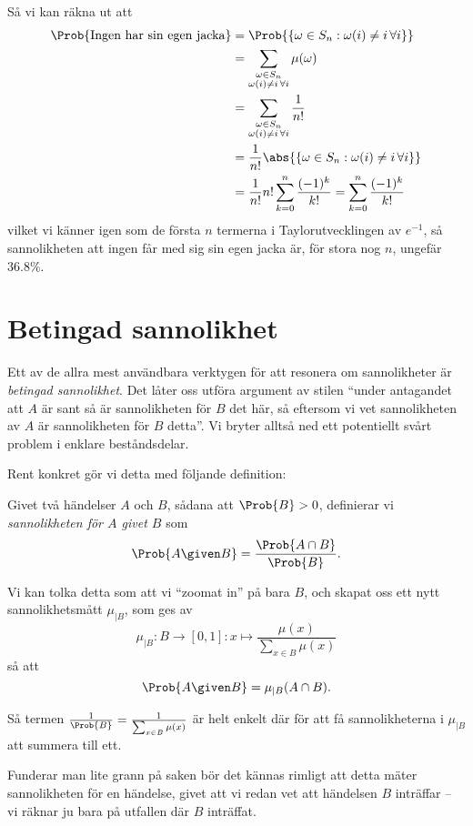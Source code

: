 \documentclass[nobib]{tufte-handout}
\begin{document}
\begin{example}
    Så vi kan räkna ut att
    \begin{align*}
        \Prob{\text{Ingen har sin egen jacka}} &= \Prob{\left\{\omega \in S_n: \omega(i) \neq i\, \forall i\right\}}\\
        &= \sum_{\substack{\omega \in S_n\\\omega(i) \neq i\, \forall i}} \mu(\omega)\\
        &= \sum_{\substack{\omega \in S_n\\\omega(i) \neq i\, \forall i}} \frac{1}{n!}\\
        &= \frac{1}{n!}\abs{\left\{\omega \in S_n: \omega(i) \neq i\, \forall i\right\}}\\
        &= \frac{1}{n!}n!\sum_{k=0}^{n} \frac{(-1)^k}{k!} = \sum_{k=0}^{n} \frac{(-1)^k}{k!}
    \end{align*}
    vilket vi känner igen som de första $n$ termerna i Taylorutvecklingen av $e^{-1}$, så sannolikheten att ingen får med sig sin egen jacka är, för stora nog $n$, ungefär $36.8\%$.
\end{example}

\section{Betingad sannolikhet}

Ett av de allra mest användbara verktygen för att resonera om sannolikheter är \emph{betingad sannolikhet}. Det låter oss utföra argument av stilen ``under antagandet att $A$ är sant så är sannolikheten för $B$ det här, så eftersom vi vet sannolikheten av $A$ är sannolikheten för $B$ detta''. Vi bryter alltså ned ett potentiellt svårt problem i enklare beståndsdelar.

Rent konkret gör vi detta med följande definition:

\begin{definition}
    Givet två händelser $A$ och $B$, sådana att $\Prob{B} > 0$, definierar vi \emph{sannolikheten för $A$ givet $B$} som
    $$\Prob{A \given B} = \frac{\Prob{A \cap B}}{\Prob{B}}.$$

    Vi kan tolka detta som att vi ``zoomat in'' på bara $B$, och skapat oss ett nytt sannolikhetsmått $\mu_{|B}$, som ges av
    $$\mu_{|B}: B \to [0,1]: x \mapsto \frac{\mu(x)}{\sum_{x\in B} \mu(x)}$$
    så att
    $$\Prob{A \given B} = \mu_{|B}(A \cap B).$$
    
    Så termen $\frac{1}{\Prob{B}} = \frac{1}{\sum_{x\in B} \mu(x)}$ är helt enkelt där för att få sannolikheterna i $\mu_{|B}$ att summera till ett.

    Funderar man lite grann på saken bör det kännas rimligt att detta mäter sannolikheten för en händelse, givet att vi redan vet att händelsen $B$ inträffar -- vi räknar ju bara på utfallen där $B$ inträffat.
\end{definition}
\end{document}
